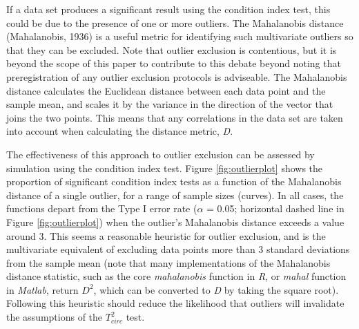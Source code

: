 \documentclass[]{article}
\begin{document}
If a data set produces a significant result using the condition index test, this could be due to the presence of one or more outliers. The Mahalanobis distance (Mahalanobis, 1936) is a useful metric for identifying such multivariate outliers so that they can be excluded. Note that outlier exclusion is contentious, but it is beyond the scope of this paper to contribute to this debate beyond noting that preregistration of any outlier exclusion protocols is adviseable. The Mahalanobis distance calculates the Euclidean distance between each data point and the sample mean, and scales it by the variance in the direction of the vector that joins the two points. This means that any correlations in the data set are taken into account when calculating the distance metric, \emph{D}.

The effectiveness of this approach to outlier exclusion can be assessed by simulation using the condition index test. Figure \ref{fig:outlierplot} shows the proportion of significant condition index tests as a function of the Mahalanobis distance of a single outlier, for a range of sample sizes (curves). In all cases, the functions depart from the Type I error rate (\(\alpha\) = 0.05; horizontal dashed line in Figure \ref{fig:outlierplot}) when the outlier's Mahalanobis distance exceeds a value around 3. This seems a reasonable heuristic for outlier exclusion, and is the multivariate equivalent of excluding data points more than 3 standard deviations from the sample mean (note that many implementations of the Mahalanobis distance statistic, such as the core \emph{mahalanobis} function in \emph{R}, or \emph{mahal} function in \emph{Matlab}, return \(D^2\), which can be converted to \emph{D} by taking the square root). Following this heuristic should reduce the likelihood that outliers will invalidate the assumptions of the \(T^2_{circ}\) test.
\end{document}
